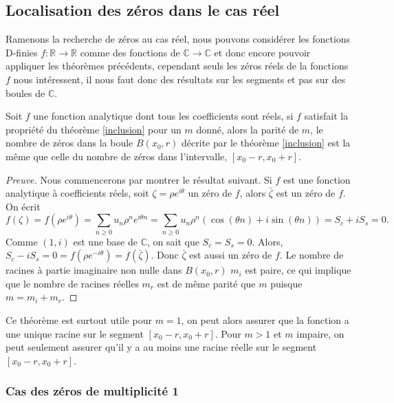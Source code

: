 \documentclass[a4paper,10pt]{article}
\begin{document}
		

	\subsection{Localisation des zéros dans le cas réel}
	\noindent Ramenons la recherche de zéros au cas réel, nous pouvons considérer les fonctions D-finies $f:\mathbb{R}\rightarrow\mathbb{R}$ comme des fonctions de $\mathbb{C}\rightarrow\mathbb{C}$ et donc encore pouvoir appliquer les théorèmes précédents, cependant seuls les zéros réels de la fonctions $f$ nous intéressent, il nous faut donc des résultats sur les segments et pas sur des boules de $\mathbb{C}$.
	\begin{theorem}
		Soit $f$ une fonction analytique dont tous les coefficients sont réels, si $f$ satisfait la propriété du théorème \ref{inclusion} pour un $m$ donné, alors la parité de $m$, le nombre de zéros dans la boule $B(x_0,r)$ décrite par le théorème \ref{inclusion} est la même que celle du nombre de zéros dans l'intervalle, $[x_0-r,x_0+r]$.
	\end{theorem}
	
	\begin{proof}[Preuve]
		Nous commencerons par montrer le résultat suivant. Si $f$ est une fonction analytique à coefficients réels, soit $\zeta=\rho e^{i\theta}$ un zéro de $f$, alors $\bar{\zeta}$ est un zéro de $f$.\\
		On écrit
		\[f(\zeta)=f(\rho e^{i\theta})=\sum_{n\geq 0} u_n \rho^ne^{i\theta n}=\sum_{n\geq 0} u_n \rho^n(\cos(\theta n)+i\sin(\theta n))= S_c+ i S_s=0.\]
		Comme $(1,i)$ est une base de $\mathbb{C}$, on sait que $S_c=S_s=0$. Alors, $S_c-iS_s=0=f(\rho e^{-i\theta})=f(\bar{\zeta})$.
		Donc $\bar{\zeta}$ est aussi un zéro de $f$. Le nombre de racines à partie imaginaire non nulle dans $B(x_0,r)$ $m_i$ est paire, ce qui implique que le nombre de racines réelles $m_r$ est de même parité que $m$ puisque $m=m_i+m_r$.
	\end{proof}
	
	Ce théorème est surtout utile pour $m=1$, on peut alors assurer que la fonction a une unique racine sur le segment $[x_0-r,x_0+r]$. Pour $m>1$ et $m$ impaire, on peut seulement assurer qu'il y a au moins une racine réelle sur le segment $[x_0-r,x_0+r]$.
	
	\subsubsection{Cas des zéros de multiplicité 1}
	
\end{document}
